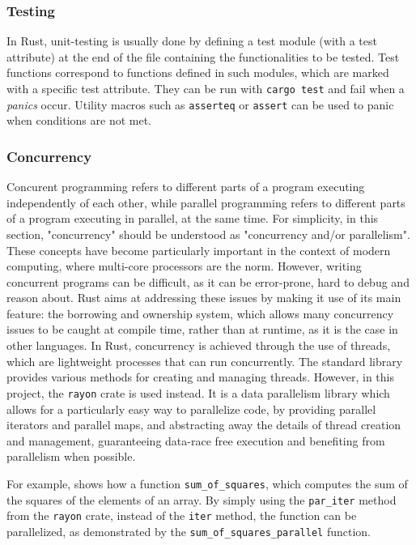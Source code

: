 \subsubsection{Testing}

In Rust, unit-testing is usually done by defining a test module (with a test attribute) at the end of the file containing the functionalities to be
tested. Test functions correspond to functions defined in such modules, which are marked with a specific test attribute. They can be run
with \texttt{cargo test} and fail when a \textit{panics} occur.  Utility macros such as \texttt{asserteq} or \texttt{assert} can be used to panic
when conditions are not met.

\subsubsection{Concurrency}

Concurent programming refers to different parts of a program executing independently of each other, while parallel programming refers to different parts
of a program executing in parallel, at the same time. For simplicity, in this section, "concurrency" should be understood as "concurrency and/or parallelism".
These concepts have become particularly important in the context of modern computing, where multi-core processors are the norm. However, writing concurrent
programs can be difficult, as it can be error-prone, hard to debug and reason about. Rust aims at addressing these issues by making it use of its main feature:
the borrowing and ownership system, which allows many concurrency issues to be caught at compile time, rather than at runtime, as it is the case in other languages.
In Rust, concurrency is achieved through the use of threads, which are lightweight processes that can run concurrently. The standard library provides
various methods for creating and managing threads. However, in this project, the \texttt{rayon} crate is used instead. It is a data parallelism library
which allows for a particularly easy way to parallelize code, by providing parallel iterators and parallel maps, and abstracting away the details of
thread creation and management, guaranteeing data-race free execution and benefiting from parallelism when possible.

For example,  shows how a function \texttt{sum\_of\_squares}, which computes the sum of the squares of the elements of an array.
By simply using the \texttt{par\_iter} method from the \texttt{rayon} crate, instead of the \texttt{iter} method, the function can be parallelized, as demonstrated
by the \texttt{sum\_of\_squares\_parallel} function.

